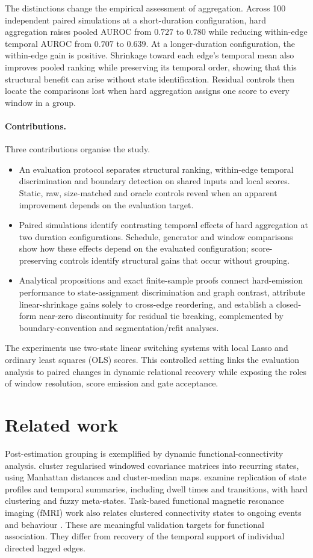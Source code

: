 \documentclass[11pt]{article}
\begin{document}
The distinctions change the empirical assessment of aggregation. Across
100 independent paired simulations at a short-duration configuration, hard
aggregation raises pooled AUROC from $0.727$ to $0.780$ while reducing
within-edge temporal AUROC from $0.707$ to $0.639$. At a longer-duration
configuration, the within-edge gain is positive. Shrinkage toward each edge's
temporal mean also improves pooled ranking while preserving its temporal order,
showing that this structural benefit can arise without state identification.
Residual controls then locate the comparisons lost when hard aggregation
assigns one score to every window in a group.

\paragraph{Contributions.} Three contributions organise the study.
\begin{itemize}
\item An evaluation protocol separates structural ranking, within-edge temporal
discrimination and boundary detection on shared inputs and local scores.
Static, raw, size-matched and oracle controls reveal when an apparent
improvement depends on the evaluation target.
\item Paired simulations identify contrasting temporal effects of hard
aggregation at two duration configurations. Schedule, generator and window
comparisons show how these effects depend on the evaluated configuration;
score-preserving controls identify structural gains that occur without grouping.
\item Analytical propositions and exact finite-sample proofs connect
hard-emission performance to state-assignment discrimination and graph contrast,
attribute linear-shrinkage gains solely to cross-edge reordering, and
establish a closed-form near-zero discontinuity for residual tie breaking,
complemented by boundary-convention and segmentation/refit analyses.
\end{itemize}
The experiments use two-state linear switching systems with local Lasso and
ordinary least squares (OLS) scores. This controlled setting links the
evaluation analysis to paired changes in dynamic relational recovery while
exposing the roles of window resolution, score emission and gate acceptance.

\section{Related work}
\label{sec:related}
Post-estimation grouping is exemplified by dynamic functional-connectivity
analysis. \citet{allen2014tracking} cluster regularised windowed covariance
matrices into recurring states, using Manhattan distances and cluster-median
maps. \citet{abrol2017replicability} examine replication of state profiles and
temporal summaries, including dwell times and transitions, with hard clustering
and fuzzy meta-states. Task-based functional magnetic resonance imaging (fMRI)
work also relates clustered connectivity states to ongoing events and behaviour
\citep{chang2026neurocognitive}.
These are meaningful validation targets for functional association. They differ
from recovery of the temporal support of individual directed lagged edges.
\end{document}
